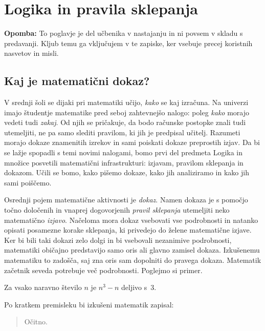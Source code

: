 \chapter{Logika in pravila sklepanja}
\label{chap:logika}


\textbf{Opomba:} To poglavje je del učbenika v nastajanju in ni povsem v skladu s predavanji. Kljub temu ga vključujem v te zapiske, ker vsebuje precej koristnih nasvetov in misli.

\section{Kaj je matematični dokaz?}
\label{sec:kaj-je-dokaz}

V srednji šoli se dijaki pri matematiki učijo, \emph{kako} se kaj
izračuna. Na univerzi imajo študentje matematike pred seboj
zahtevnejšo nalogo: poleg \emph{kako} morajo vedeti tudi \emph{zakaj}.
Od njih se pričakuje, da bodo računske postopke znali tudi utemeljiti,
ne pa samo slediti pravilom, ki jih je predpisal učitelj. Razumeti
morajo dokaze znamenitih izrekov in sami poiskati dokaze preprostih
izjav. Da bi se lažje spopadli s temi novimi nalogami, bomo prvi del
predmeta Logika in množice posvetili matematični infrastrukturi:
izjavam, pra\-vi\-lom sklepanja in dokazom. Učili se bomo, kako pišemo
dokaze, kako jih analiziramo in kako jih sami poiščemo.

Osrednji pojem matematične aktivnosti je \emph{dokaz}. Namen dokaza je
s pomočjo točno določenih in vnaprej dogovorjenih \emph{pravil
  sklepanja} utemeljiti neko matematično \emph{izjavo}. Načeloma mora
dokaz vsebovati vse podrobnosti in natanko opisati posamezne korake
sklepanja, ki privedejo do želene matematične izjave. Ker bi bili taki
dokazi zelo dolgi in bi vsebovali nezanimive podrobnosti, matematiki
običajno predstavijo samo oris ali glavno zamisel dokaza. Izkušenemu
matematiku to zadošča, saj zna oris sam dopolniti do pravega dokaza.
Matematik začetnik seveda potrebuje več podrobnosti. Poglejmo si
primer.

\begin{izrek}
  \label{izr:n3-n-deljivo-3}
  Za vsako naravno število $n$ je $n^3 - n$ deljivo s~$3$.
\end{izrek}

\noindent
Po kratkem premisleku bi izkušeni matematik zapisal:

\begin{quote}
  \begin{dokaz}
    Očitno.
  \end{dokaz}
\end{quote}

